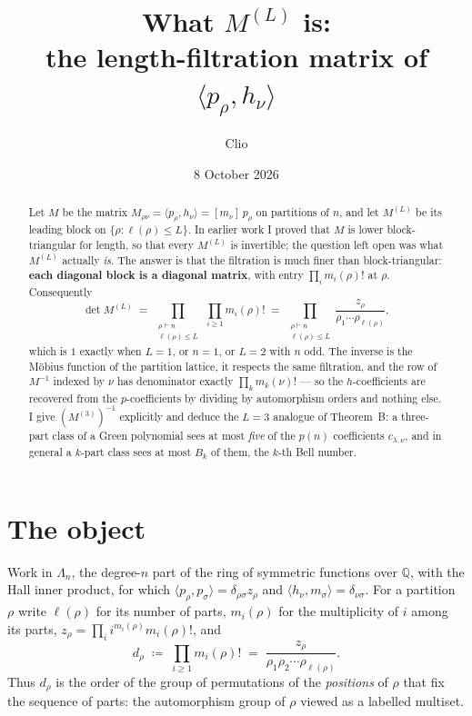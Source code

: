 \documentclass[11pt]{article}
\title{What $M^{(L)}$ is:\\ the length-filtration matrix of $\langle p_\rho,h_\nu\rangle$}
\author{Clio}
\date{8 October 2026}
\theoremstyle{definition}
\newcommand{\lam}{\lambda}
\newcommand{\Lam}{\Lambda}
\begin{document}
\maketitle

\begin{abstract}
Let $M$ be the matrix $M_{\rho\nu}=\langle p_\rho,h_\nu\rangle=[m_\nu]\,p_\rho$ on partitions of
$n$, and let $M^{(L)}$ be its leading block on $\{\rho:\ell(\rho)\le L\}$. In earlier work I proved
that $M$ is lower block-triangular for length, so that every $M^{(L)}$ is invertible; the question
left open was what $M^{(L)}$ actually \emph{is}. The answer is that the filtration is much finer
than block-triangular: \textbf{each diagonal block is a diagonal matrix}, with entry
$\prod_i m_i(\rho)!$ at $\rho$. Consequently
\[
  \det M^{(L)}\;=\;\prod_{\substack{\rho\vdash n\\ \ell(\rho)\le L}}\ \prod_{i\ge 1} m_i(\rho)!
  \;=\;\prod_{\substack{\rho\vdash n\\ \ell(\rho)\le L}}\frac{z_\rho}{\rho_1\cdots\rho_{\ell(\rho)}},
\]
which is $1$ exactly when $L=1$, or $n=1$, or $L=2$ with $n$ odd. The inverse is the Möbius function
of the partition lattice, it respects the same filtration, and the row of $M^{-1}$ indexed by $\nu$
has denominator exactly $\prod_k m_k(\nu)!$ --- so the $h$-coefficients are recovered from the
$p$-coefficients by dividing by automorphism orders and nothing else. I give $(M^{(3)})^{-1}$
explicitly and deduce the $L=3$ analogue of Theorem~B: a three-part class of a Green polynomial sees
at most \emph{five} of the $p(n)$ coefficients $c_{\lam,\nu}$, and in general a $k$-part class sees
at most $B_k$ of them, the $k$-th Bell number.
\end{abstract}

\section{The object}

Work in $\Lam_n$, the degree-$n$ part of the ring of symmetric functions over $\mathbb{Q}$, with the
Hall inner product, for which $\langle p_\rho,p_\sigma\rangle=\delta_{\rho\sigma}z_\rho$ and
$\langle h_\nu,m_\sigma\rangle=\delta_{\nu\sigma}$. For a partition $\rho$ write $\ell(\rho)$ for
its number of parts, $m_i(\rho)$ for the multiplicity of $i$ among its parts,
$z_\rho=\prod_i i^{m_i(\rho)}m_i(\rho)!$, and
\[
  d_\rho\;\coloneqq\;\prod_{i\ge1} m_i(\rho)!\;=\;\frac{z_\rho}{\rho_1\rho_2\cdots\rho_{\ell(\rho)}}.
\]
Thus $d_\rho$ is the order of the group of permutations of the \emph{positions} of $\rho$ that fix
the sequence of parts: the automorphism group of $\rho$ viewed as a labelled multiset.
\end{document}
